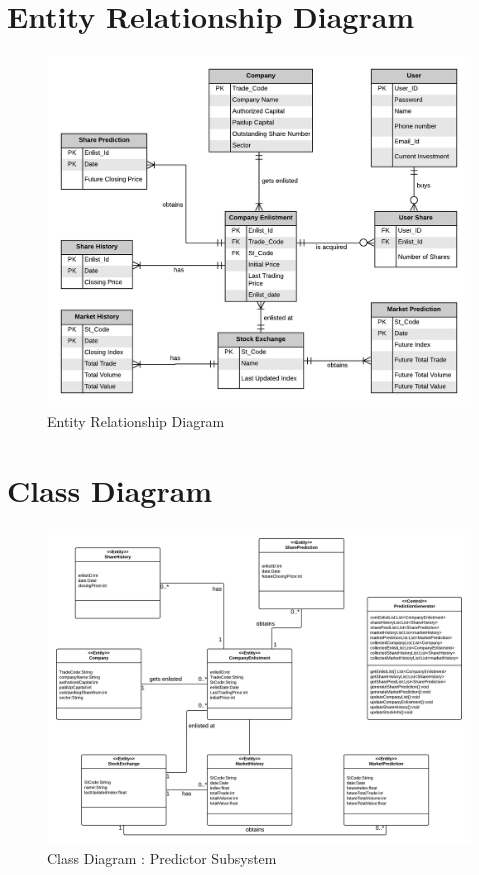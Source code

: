 \documentclass{article}[12pt]
\begin{document}
\newpage
\section{Entity Relationship Diagram}
    \begin{figure}[!h]
        \centering
        \includegraphics[width=.9\textwidth]{Images/ERD.png}
        \caption{Entity Relationship Diagram}
    \end{figure}
    
    \label{section:ERD}



\newpage
\section{Class Diagram}
    
    \begin{figure}[!h]
        \centering
        \includegraphics[width=.9\textwidth]{Images/ClassDiagram_Predictor.png}
        \caption{Class Diagram : Predictor Subsystem}
    \end{figure}
\end{document}
